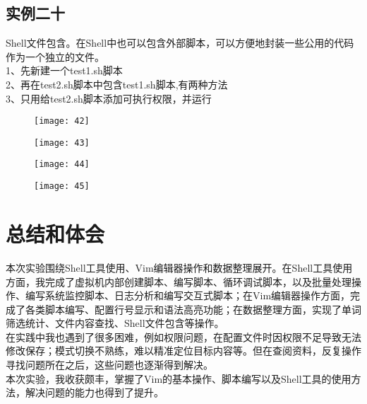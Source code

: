 \documentclass[12pt,letterpaper]{article}
\begin{document}
\subsection{实例二十}
Shell文件包含。在Shell中也可以包含外部脚本，可以方便地封装一些公用的代码作为一个独立的文件。\\
1、先新建一个test1.sh脚本\\
2、再在test2.sh脚本中包含test1.sh脚本,有两种方法\\
3、只用给test2.sh脚本添加可执行权限，并运行
\begin{figure}[H]
\centering
\texttt{[image: 42]}
\end{figure}
\vspace{-6mm}
\begin{figure}[H]
\centering
\texttt{[image: 43]}
\end{figure}
\vspace{-6mm}
\begin{figure}[H]
\centering
\texttt{[image: 44]}
\end{figure}
\vspace{-6mm}
\begin{figure}[H]
\centering
\texttt{[image: 45]}
\end{figure}

\section{总结和体会}
本次实验围绕Shell工具使用、Vim编辑器操作和数据整理展开。在Shell工具使用方面，我完成了虚拟机内部创建脚本、编写脚本、循环调试脚本，以及批量处理操作、编写系统监控脚本、日志分析和编写交互式脚本；在Vim编辑器操作方面，完成了各类脚本编写、配置行号显示和语法高亮功能；在数据整理方面，实现了单词筛选统计、文件内容查找、Shell文件包含等操作。\\
在实践中我也遇到了很多困难，例如权限问题，在配置文件时因权限不足导致无法修改保存；模式切换不熟练，难以精准定位目标内容等。但在查阅资料，反复操作寻找问题所在之后，这些问题也逐渐得到解决。\\
本次实验，我收获颇丰，掌握了Vim的基本操作、脚本编写以及Shell工具的使用方法，解决问题的能力也得到了提升。
\end{document}
